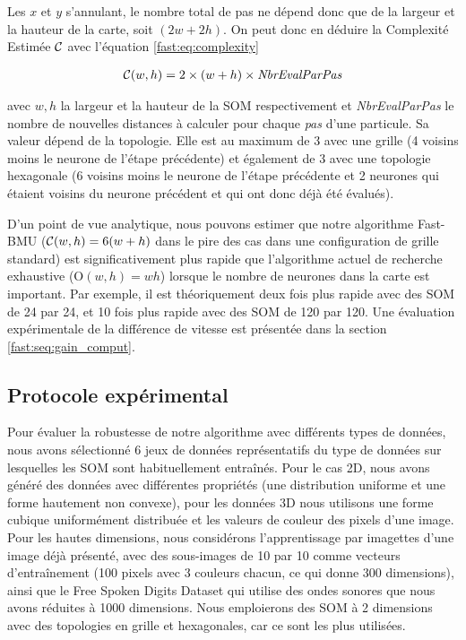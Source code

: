 	Les $x$ et $y$ s'annulant, le nombre total de pas ne dépend donc que de la largeur et la hauteur de la carte, soit $(2w + 2h)$. On peut donc en déduire la Complexité Estimée $\cal C$ avec l'équation \ref{fast:eq:complexity}

	\begin{align}\label{fast:eq:complexity}
    	{\cal C}(w, h) = 2 \times (w + h) \times \textit{NbrEvalParPas}
	\end{align}

	avec $w, h$ la largeur et la hauteur de la SOM respectivement et \textit{NbrEvalParPas} le nombre de nouvelles distances à calculer pour chaque \textit{pas} d'une particule. Sa valeur dépend de la topologie. Elle est au maximum de 3 avec une grille (4 voisins moins le neurone de l'étape précédente) et également de 3 avec une topologie hexagonale (6 voisins moins le neurone de l'étape précédente et 2 neurones qui étaient voisins du neurone précédent et qui ont donc déjà été évalués). 

	D'un point de vue analytique, nous pouvons estimer que notre algorithme Fast-BMU (${\cal C}(w,h)=6(w+h)$ dans le pire des cas dans une configuration de grille standard) est significativement plus rapide que l'algorithme actuel de recherche exhaustive (O$(w,h) = wh$) lorsque le nombre de neurones dans la carte est important. Par exemple, il est théoriquement deux fois plus rapide avec des SOM de 24 par 24, et 10 fois plus rapide avec des SOM de 120 par 120. Une évaluation expérimentale de la différence de vitesse est présentée dans la section \ref{fast:seq:gain_comput}.

	\subsection{Protocole expérimental}\label{seq:exp}

	Pour évaluer la robustesse de notre algorithme avec différents types de données, nous avons sélectionné 6 jeux de données représentatifs du type de données sur lesquelles les SOM sont habituellement entraînés. Pour le cas 2D, nous avons généré des données avec différentes propriétés (une distribution uniforme et une forme hautement non convexe), pour les données 3D nous utilisons une forme cubique uniformément distribuée et les valeurs de couleur des pixels d'une image. Pour les hautes dimensions, nous considérons l'apprentissage par imagettes d'une image déjà présenté, avec des sous-images de 10 par 10 comme vecteurs d'entraînement (100 pixels avec 3 couleurs chacun, ce qui donne 300 dimensions), ainsi que le Free Spoken Digits Dataset \cite{zohar_jackson_2018_1342401} qui utilise des ondes sonores que nous avons réduites à 1000 dimensions. Nous emploierons des SOM à 2 dimensions avec des topologies en grille et hexagonales, car ce sont les plus utilisées.

